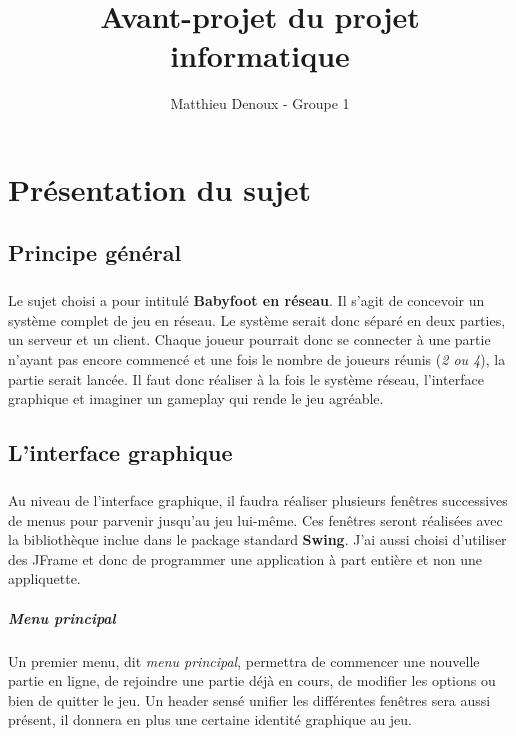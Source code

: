 \documentclass[a4paper,12pt]{report}
\title{Avant-projet du projet informatique}
\author{Matthieu Denoux - Groupe 1}
\begin{document}
\maketitle

\chapter{Présentation du sujet}

\section{Principe général}
\paragraph{}
Le sujet choisi a pour intitulé \textbf{Babyfoot en réseau}. Il s'agit de concevoir un système complet de jeu en réseau.
Le système serait donc séparé en deux parties, un serveur et un client. Chaque joueur pourrait donc se connecter à une partie
n'ayant pas encore commencé et une fois le nombre de joueurs réunis (\emph{2 ou 4}), la partie serait lancée. Il faut donc réaliser à la fois 
le système réseau, l'interface graphique et imaginer un gameplay qui rende le jeu agréable.

\section{L'interface graphique}
\paragraph{}
Au niveau de l'interface graphique, il faudra réaliser plusieurs fenêtres successives de menus pour parvenir jusqu'au jeu lui-même. Ces fenêtres seront réalisées avec la bibliothèque inclue dans le package standard \textbf{Swing}. J'ai aussi choisi d'utiliser des JFrame et donc de programmer une application à part entière et non une appliquette.
\paragraph{Menu principal}
Un premier menu, dit \emph{menu principal}, permettra de commencer une nouvelle partie en ligne, de rejoindre une partie
déjà en cours, de modifier les options ou bien de quitter le jeu. Un header sensé unifier les différentes fenêtres sera aussi présent, il donnera en plus une certaine identité graphique au jeu.
\end{document}
